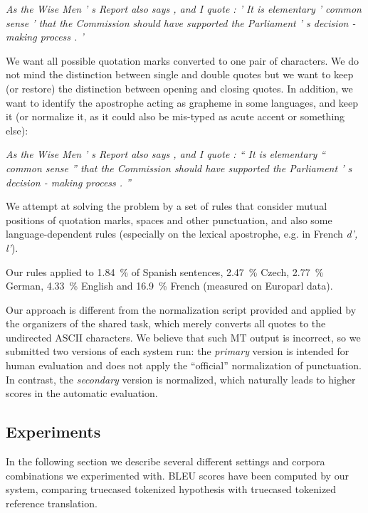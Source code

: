 \documentclass[11pt,letterpaper]{article}
\begin{document}
\textit{As the Wise Men ' s Report also says , and I quote : ' It is elementary ' common sense ' that the Commission should have supported the Parliament ' s decision - making process . '}

We want all possible quotation marks converted to one pair of characters.
We do not mind the distinction between single and double quotes but we want to keep
(or restore) the distinction between opening and closing quotes.
In addition, we want to identify the apostrophe acting as grapheme
in some languages, and keep it (or normalize it, as it could also be mis-typed
as acute accent or something else):

\textit{As the Wise Men ' s Report also says , and I quote : “ It is elementary “ common sense ” that the Commission should have supported the Parliament ' s decision - making process . ”}

We attempt at solving the problem by a set of rules that consider mutual positions of
quotation marks, spaces and other punctuation, and also some language-dependent
rules (especially on the lexical apostrophe, e.g. in French \textit{d', l'}).

Our rules applied to 1.84~\% of Spanish sentences, 2.47~\% Czech, 2.77~\% German,
4.33~\% English and 16.9~\% French (measured on Europarl data).

Our approach is different from the normalization script provided and applied by the organizers
of the shared task, which merely converts all quotes to the undirected ASCII characters.
We believe that such MT output is incorrect, so we submitted two versions of each system run:
the \textit{primary} version is intended for human evaluation and does not apply the
``official'' normalization of punctuation. In contrast, the \textit{secondary} version is normalized,
which naturally leads to higher scores in the automatic evaluation.



\subsection{Experiments}
\label{sec:experiments}

In the following section we describe several different settings and corpora combinations we experimented with.
BLEU scores have been computed by our system,
comparing truecased tokenized hypothesis with truecased tokenized reference translation.
\end{document}
